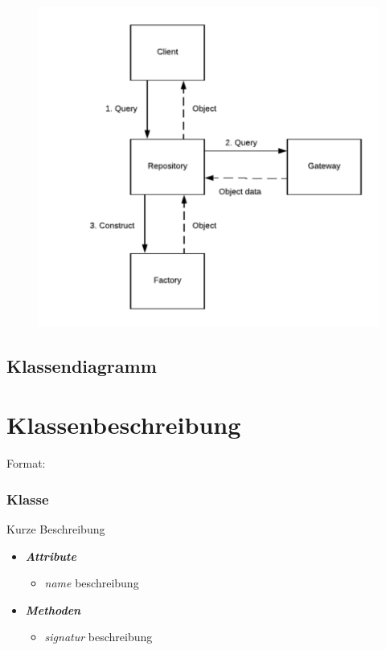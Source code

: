 \documentclass[a4paper,12pt]{article}
\begin{document}
\begin{figure}
\includegraphics[width=\textwidth]{high_lvl_repository}
\end{figure}

\clearpage
\subsection{Klassendiagramm}





\clearpage
\section{Klassenbeschreibung}

\iffalse
Format:
\subsubsection{Klasse}

Kurze Beschreibung

\begin{itemize}[label={}]

	\item \textit{\textbf{Attribute}}
		\begin{itemize}[label={\textbullet}]
			\item \textit{name} beschreibung
		\end{itemize}

	\item \textit{\textbf{Methoden}}
		\begin{itemize}[label={\textbullet}]
			\item \textit{signatur} beschreibung
		\end{itemize}


\end{itemize}
\end{document}
